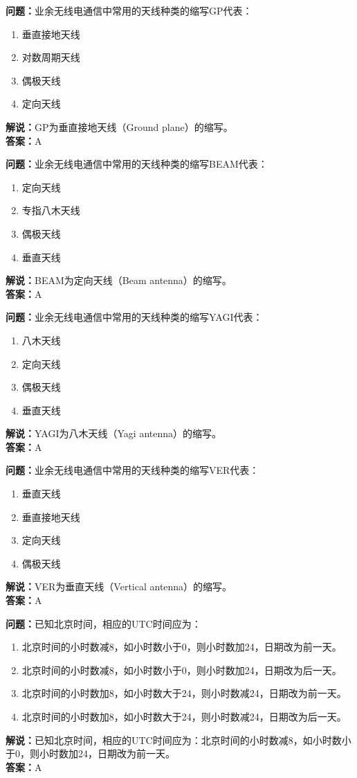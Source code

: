 \documentclass{ctexbook}%
\begin{document}
\textbf{问题：}业余无线电通信中常用的天线种类的缩写GP代表：
\begin{enumerate}[label=\Alph*), leftmargin=3em]
\item 垂直接地天线
\item 对数周期天线
\item 偶极天线
\item 定向天线
\end{enumerate}
\textbf{解说：}GP为垂直接地天线（Ground plane）的缩写。\\
\textbf{答案：}A

\textbf{问题：}业余无线电通信中常用的天线种类的缩写BEAM代表：
\begin{enumerate}[label=\Alph*), leftmargin=3em]
\item 定向天线
\item 专指八木天线
\item 偶极天线
\item 垂直天线
\end{enumerate}
\textbf{解说：}BEAM为定向天线（Beam antenna）的缩写。\\
\textbf{答案：}A

\textbf{问题：}业余无线电通信中常用的天线种类的缩写YAGI代表：
\begin{enumerate}[label=\Alph*), leftmargin=3em]
\item 八木天线
\item 定向天线
\item 偶极天线
\item 垂直天线
\end{enumerate}
\textbf{解说：}YAGI为八木天线（Yagi antenna）的缩写。\\
\textbf{答案：}A

\textbf{问题：}业余无线电通信中常用的天线种类的缩写VER代表：
\begin{enumerate}[label=\Alph*), leftmargin=3em]
\item 垂直天线
\item 垂直接地天线
\item 定向天线
\item 偶极天线
\end{enumerate}
\textbf{解说：}VER为垂直天线（Vertical antenna）的缩写。\\
\textbf{答案：}A

\textbf{问题：}已知北京时间，相应的UTC时间应为：
\begin{enumerate}[label=\Alph*), leftmargin=3em]
\item 北京时间的小时数减8，如小时数小于0，则小时数加24，日期改为前一天。
\item 北京时间的小时数减8，如小时数小于0，则小时数加24，日期改为后一天。
\item 北京时间的小时数加8，如小时数大于24，则小时数减24，日期改为前一天。
\item 北京时间的小时数加8，如小时数大于24，则小时数减24，日期改为后一天。
\end{enumerate}
\textbf{解说：}已知北京时间，相应的UTC时间应为：北京时间的小时数减8，如小时数小于0，则小时数加24，日期改为前一天。\\
\textbf{答案：}A
\end{document}
